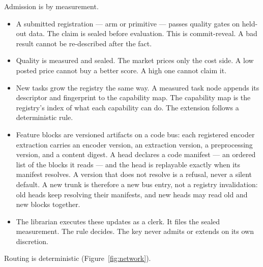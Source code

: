 \documentclass[11pt]{article}
\begin{document}
Admission is by measurement.
\begin{itemize}
\item A submitted registration --- arm or primitive --- passes
quality gates on held-out data. The claim is sealed before
evaluation. This is commit-reveal. A bad result cannot be
re-described after the fact.
\item Quality is measured and sealed. The market prices only the
cost side. A low posted price cannot buy a better score. A high
one cannot claim it.
\item New tasks grow the registry the same way. A measured task
node appends its descriptor and fingerprint to the capability
map. The capability map is the registry's index of what each
capability can do. The extension follows a deterministic rule.
\item Feature blocks are versioned artifacts on a code bus: each
registered encoder extraction carries an encoder version, an
extraction version, a preprocessing version, and a content
digest. A head declares a code manifest --- an ordered list of
the blocks it reads --- and the head is replayable exactly when
its manifest resolves. A version that does not resolve is a
refusal, never a silent default. A new trunk is therefore a new
bus entry, not a registry invalidation: old heads keep resolving
their manifests, and new heads may read old and new blocks
together.
\item The librarian executes these updates as a clerk. It files
the sealed measurement. The rule decides. The key never admits or
extends on its own discretion.
\end{itemize}
Routing is deterministic
(Figure~\ref{fig:network}).
\end{document}
